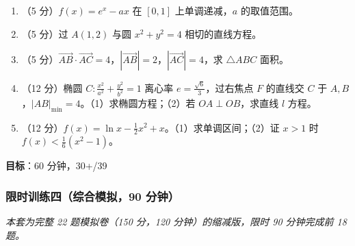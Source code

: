 \begin{enumerate}
  \item（5 分）$f(x)=e^x-ax$ 在 $[0,1]$ 上单调递减，$a$ 的取值范围。
  \item（5 分）过 $A(1,2)$ 与圆 $x^2+y^2=4$ 相切的直线方程。
  \item（5 分）$\overrightarrow{AB}\cdot\overrightarrow{AC}=4$，$|\overrightarrow{AB}|=2$，$|\overrightarrow{AC}|=4$，求 $\triangle ABC$ 面积。
  \item（12 分）椭圆 $C:\frac{x^2}{a^2}+\frac{y^2}{b^2}=1$ 离心率 $e=\frac{\sqrt6}{3}$，过右焦点 $F$ 的直线交 $C$ 于 $A,B$，$|AB|_{\min}=4$。（1）求椭圆方程；（2）若 $OA\perp OB$，求直线 $l$ 方程。
  \item（12 分）$f(x)=\ln x - \frac12x^2 + x$。（1）求单调区间；（2）证 $x>1$ 时 $f(x)<\frac16(x^2-1)$。
\end{enumerate}

\textbf{目标}：60 分钟，30+/39

\subsubsection{限时训练四（综合模拟，90 分钟）}

\textit{本套为完整 22 题模拟卷（150 分，120 分钟）的缩减版，限时 90 分钟完成前 18 题。}


